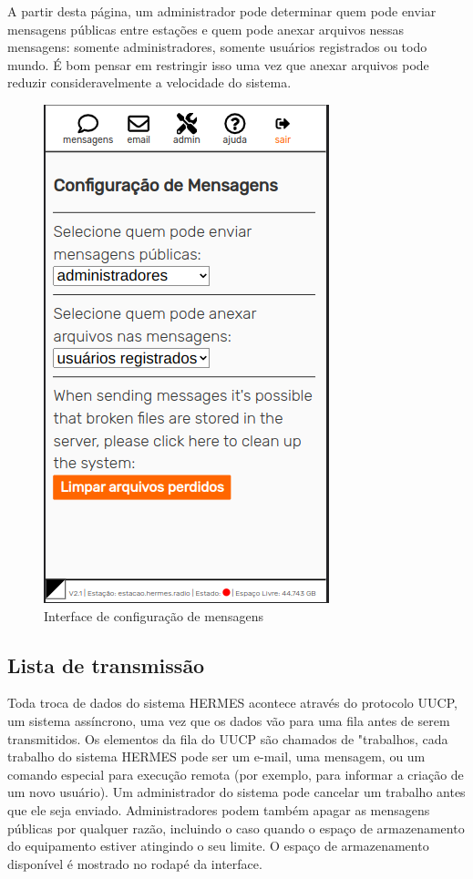 \documentclass[11pt,a4paper]{article}
\begin{document}
A partir desta página, um administrador pode determinar quem pode enviar mensagens públicas entre estações e quem pode anexar arquivos nessas mensagens: somente administradores, somente usuários registrados ou todo mundo. É bom pensar em restringir isso uma vez que anexar arquivos pode reduzir consideravelmente a velocidade do sistema.


   
    \begin{figure}[H]
    \centering
    \includegraphics[width=0.5\columnwidth]{screenshots/frontend/pt_kn/messageadm.png}
    \caption{Interface de configuração de mensagens}
    \label{fig:messageadm}
   
    \end{figure}


\subsection{Lista de transmissão}
\label{gui_trans_list}

Toda troca de dados do sistema HERMES acontece através do protocolo UUCP, um sistema assíncrono, uma vez que os dados vão para uma fila antes de serem transmitidos. Os elementos da fila do UUCP são chamados de "trabalhos, cada trabalho do sistema HERMES pode ser um e-mail, uma mensagem, ou um comando especial para execução remota (por exemplo, para informar a criação de um novo usuário). Um administrador do sistema pode cancelar um trabalho antes que ele seja enviado. Administradores podem também apagar as mensagens públicas por qualquer razão, incluindo o caso quando o espaço de armazenamento do equipamento estiver atingindo o seu limite. O espaço de armazenamento disponível é mostrado no rodapé da interface. 
\end{document}
